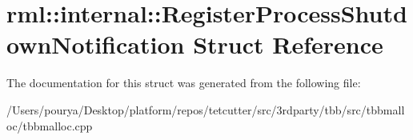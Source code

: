 \hypertarget{structrml_1_1internal_1_1RegisterProcessShutdownNotification}{}\section{rml\+:\+:internal\+:\+:Register\+Process\+Shutdown\+Notification Struct Reference}
\label{structrml_1_1internal_1_1RegisterProcessShutdownNotification}


The documentation for this struct was generated from the following file\+:\begin{DoxyCompactItemize}
\item 
/\+Users/pourya/\+Desktop/platform/repos/tetcutter/src/3rdparty/tbb/src/tbbmalloc/tbbmalloc.\+cpp\end{DoxyCompactItemize}
